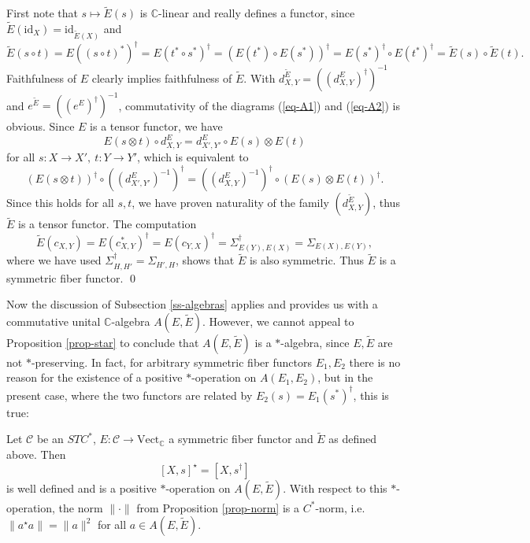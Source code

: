 \documentclass[12pt]{article}
\theoremstyle{definition}
\theoremstyle{definition}
\theoremstyle{remark}
\newcommand{\Vect}{\mathrm{Vect}}
\def\2#1{{\mathcal #1}}
\def\7#1{{\mathbb #1}}
\newcommand{\mcirc}{\circ}
\newcommand{\rarr}{\rightarrow}
\def\id{\mathrm{id}}
\begin{document}
\prf First note that $s\mapsto\widetilde{E}(s)$ is $\7C$-linear and really defines a functor, since 
$\widetilde{E}(\id_X)=\id_{\widetilde{E}(X)}$ and 
\[ \widetilde{E}(s\circ t)=E((s\circ t)^*)^\dagger=E(t^*\circ
s^*)^\dagger=(E(t^*)\circ E(s^*))^\dagger =E(s^*)^\dagger\circ
E(t^*)^\dagger=\widetilde{E}(s)\circ\widetilde{E}(t). \] Faithfulness
of $E$ clearly implies faithfulness of $\widetilde{E}$.  With
$d^{\widetilde{E}}_{X,Y}=((d^E_{X,Y})^\dagger)^{-1}$ and
$e^{\widetilde{E}}=((e^E)^\dagger)^{-1}$, commutativity of the
diagrams (\ref{eq-A1}) and (\ref{eq-A2}) is obvious. Since $E$ is a
tensor functor, we have
\[ E(s\otimes t)\mcirc d^E_{X,Y}=d^E_{X',Y'}\mcirc E(s)\otimes E(t) \]
for all $s:X\rarr X',\ t:Y\rarr Y'$, which is equivalent to
\[ (E(s\otimes t))^\dagger\mcirc((d^E_{X',Y'})^{-1})^\dagger 
   =((d^E_{X,Y})^{-1})^\dagger\mcirc(E(s)\otimes E(t))^\dagger. \]
Since this holds for all $s,t$, we have proven naturality of the family
$(d^{\widetilde{E}}_{X,Y})$, thus $\widetilde{E}$ is a tensor functor. The computation
\[
\widetilde{E}(c_{X,Y})=E(c_{X,Y}^*)^\dagger=E(c_{Y,X})^\dagger=\Sigma_{E(Y),E(X)}^\dagger
=\Sigma_{E(X),E(Y)}, \] where we have used
$\Sigma_{H,H'}^\dagger=\Sigma_{H',H}$, shows that $\widetilde{E}$ is
also symmetric. Thus $\widetilde{E}$ is a symmetric fiber functor.
\qed

Now the discussion of Subsection \ref{ss-algebras} applies and
provides us with a commutative unital $\7C$-algebra
$A(E,\widetilde{E})$. However, we cannot appeal to Proposition
\ref{prop-star} to conclude that $A(E,\widetilde{E})$ is a
$*$-algebra, since $E,\widetilde{E}$ are not $*$-preserving.  In fact,
for arbitrary symmetric fiber functors $E_1,E_2$ there is no reason
for the existence of a positive $*$-operation on $A(E_1,E_2)$, but in
the present case, where the two functors are related by
$E_2(s)=E_1(s^*)^\dagger$, this is true:

\bprop Let $\2C$ be an $STC^*$, $E:\2C\rarr\Vect_\7C$ a symmetric fiber functor and $\widetilde{E}$
as defined above. Then 
\[ [X,s]^\star=[X,s^\dagger] \] is well defined and is a positive
$*$-operation on $A(E,\widetilde{E})$. With respect to this
$*$-operation, the norm $\|\cdot\|$ from Proposition \ref{prop-norm}
is a $C^*$-norm, i.e.\ $\|a^\star a\|=\|a\|^2$ for all $a\in
A(E,\widetilde{E})$.  \eprop
\end{document}
